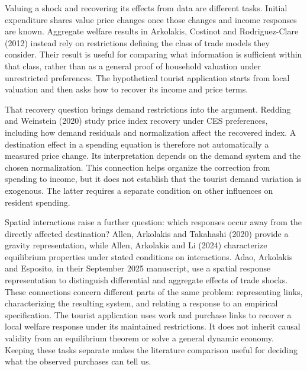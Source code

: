 Valuing a shock and recovering its effects from data are different tasks. Initial
expenditure shares value price changes once those changes and income responses
are known. Aggregate welfare results in Arkolakis, Costinot and Rodriguez-Clare
(2012) instead rely on restrictions defining the class of trade models they
consider. Their result is useful for comparing what information is sufficient
within that class, rather than as a general proof of household valuation under
unrestricted preferences. The hypothetical tourist application starts from local
valuation and then asks how to recover its income and price terms.

That recovery question brings demand restrictions into the argument. Redding and
Weinstein (2020) study price index recovery under CES preferences, including how
demand residuals and normalization affect the recovered index. A destination
effect in a spending equation is therefore not automatically a measured price
change. Its interpretation depends on the demand system and the chosen
normalization. This connection helps organize the correction from spending to
income, but it does not establish that the tourist demand variation is exogenous.
The latter requires a separate condition on other influences on resident spending.

Spatial interactions raise a further question: which responses occur away from
the directly affected destination? Allen, Arkolakis and Takahashi (2020) provide
a gravity representation, while Allen, Arkolakis and Li (2024) characterize
equilibrium properties under stated conditions on interactions. Adao, Arkolakis
and Esposito, in their September 2025 manuscript, use a spatial response
representation to distinguish differential and aggregate effects of trade shocks.
These connections concern different parts of the same problem: representing
links, characterizing the resulting system, and relating a response to an empirical
specification. The tourist application uses work and purchase links to recover a
local welfare response under its maintained restrictions. It does not inherit
causal validity from an equilibrium theorem or solve a general dynamic economy.
Keeping these tasks separate makes the literature comparison useful for deciding
what the observed purchases can tell us.
